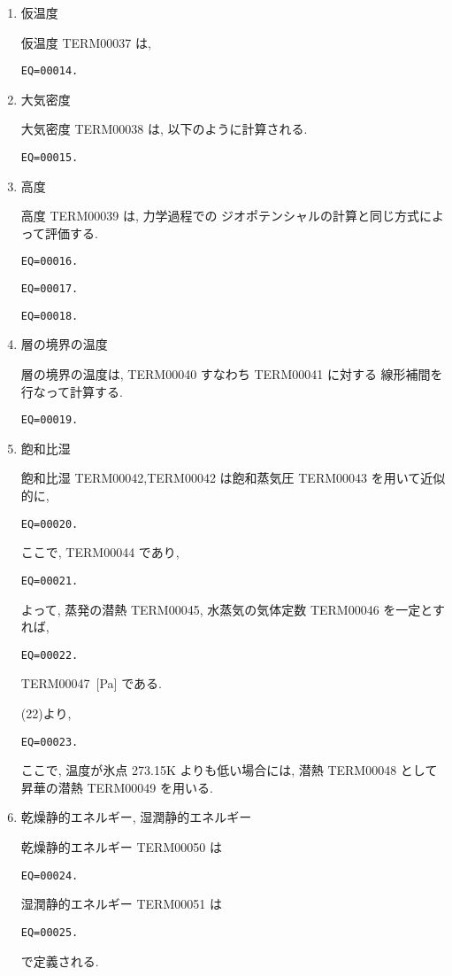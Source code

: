 \begin{enumerate}
\item 仮温度

仮温度 TERM00037 は, 
\begin{verbatim}
EQ=00014.
\end{verbatim}

\item 大気密度

大気密度 TERM00038 は, 以下のように計算される.
\begin{verbatim}
EQ=00015.
\end{verbatim}

\item 高度

高度 TERM00039 は, 力学過程での
ジオポテンシャルの計算と同じ方式によって評価する.
\begin{verbatim}
EQ=00016.
\end{verbatim}
\begin{verbatim}
EQ=00017.
\end{verbatim}
%
\begin{verbatim}
EQ=00018.
\end{verbatim}


\item 層の境界の温度

層の境界の温度は, TERM00040 すなわち TERM00041 に対する
線形補間を行なって計算する.
\begin{verbatim}
EQ=00019.
\end{verbatim}

\item 飽和比湿

飽和比湿 TERM00042,TERM00042
は飽和蒸気圧 TERM00043 を用いて近似的に,
%
\begin{verbatim}
EQ=00020.
\end{verbatim}
%
ここで, TERM00044 であり,
%
\begin{verbatim}
EQ=00021.
\end{verbatim}
%
よって, 蒸発の潜熱 TERM00045, 水蒸気の気体定数 TERM00046 を一定とすれば,
%
\begin{verbatim}
EQ=00022.
\end{verbatim}
%
TERM00047\ [Pa] である.

(22)より,
%
\begin{verbatim}
EQ=00023.
\end{verbatim}

ここで, 温度が氷点 273.15K よりも低い場合には,
潜熱 TERM00048 として昇華の潜熱 TERM00049 を用いる.

\item 乾燥静的エネルギー, 湿潤静的エネルギー

乾燥静的エネルギー TERM00050 は
\begin{verbatim}
EQ=00024.
\end{verbatim}
%
湿潤静的エネルギー TERM00051 は
\begin{verbatim}
EQ=00025.
\end{verbatim}
で定義される.

\end{enumerate}
